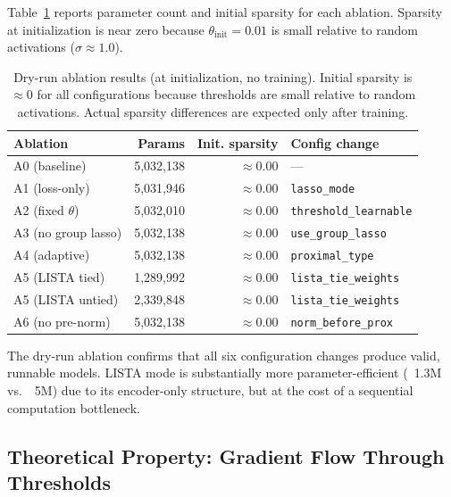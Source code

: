 \documentclass{article}
\begin{document}
Table~\ref{tab:ablation} reports parameter count and initial sparsity for
each ablation. Sparsity at initialization is near zero because
$\theta_{\text{init}} = 0.01$ is small relative to random activations
($\sigma \approx 1.0$).

\begin{table}[h]
\centering
\caption{Dry-run ablation results (at initialization, no training).
         Initial sparsity is $\approx 0$ for all configurations because
         thresholds are small relative to random activations.
         Actual sparsity differences are expected only after training.}
\label{tab:ablation}
\begin{tabular}{lrrl}
\toprule
Ablation & Params & Init. sparsity & Config change \\
\midrule
A0 (baseline) & 5,032,138 & $\approx 0.00$ & --- \\
A1 (loss-only) & 5,031,946 & $\approx 0.00$ & \texttt{lasso\_mode} \\
A2 (fixed $\theta$) & 5,032,010 & $\approx 0.00$ & \texttt{threshold\_learnable} \\
A3 (no group lasso) & 5,032,138 & $\approx 0.00$ & \texttt{use\_group\_lasso} \\
A4 (adaptive) & 5,032,138 & $\approx 0.00$ & \texttt{proximal\_type} \\
A5 (LISTA tied) & 1,289,992 & $\approx 0.00$ & \texttt{lista\_tie\_weights} \\
A5 (LISTA untied) & 2,339,848 & $\approx 0.00$ & \texttt{lista\_tie\_weights} \\
A6 (no pre-norm) & 5,032,138 & $\approx 0.00$ & \texttt{norm\_before\_prox} \\
\bottomrule
\end{tabular}
\end{table}

The dry-run ablation confirms that all six configuration changes produce valid,
runnable models. LISTA mode is substantially more parameter-efficient (~1.3M
vs.\ ~5M) due to its encoder-only structure, but at the cost of a sequential
computation bottleneck.

\subsection{Theoretical Property: Gradient Flow Through Thresholds}
\end{document}
